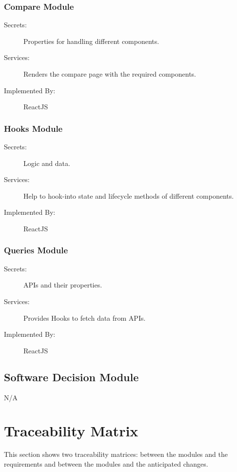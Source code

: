 \documentclass[12pt, titlepage]{article}
\begin{document}
\subsubsection{Compare Module \label{mCompareModule}}
\begin{description}
\item[Secrets:]Properties for handling different components.
\item[Services:]Renders the compare page with the required components.
\item[Implemented By:] ReactJS
\end{description}

\subsubsection{Hooks Module \label{mHooksModule}}
\begin{description}
\item[Secrets:]Logic and data.
\item[Services:]Help to hook-into state and lifecycle methods of different components.
\item[Implemented By:] ReactJS
\end{description}

\subsubsection{Queries Module \label{mQueriesModule}}
\begin{description}
\item[Secrets:]APIs and their properties.
\item[Services:]Provides Hooks to fetch data from APIs. 
\item[Implemented By:] ReactJS
\end{description}

\subsection{Software Decision Module}

N/A

\section{Traceability Matrix} \label{SecTM}

This section shows two traceability matrices: between the modules and the
requirements and between the modules and the anticipated changes.
\end{document}
